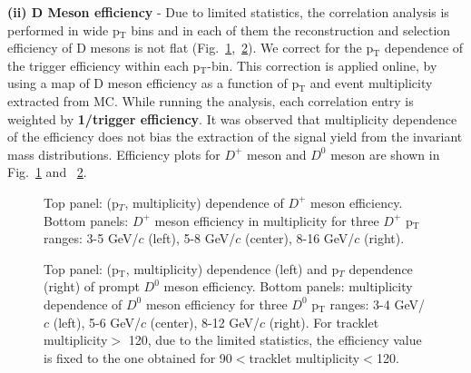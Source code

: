 {\bf \large (ii) D Meson efficiency} - Due to limited statistics, the correlation analysis is performed in wide p$_\mathrm{T}$ bins and in each of them the reconstruction and selection efficiency of D mesons is not flat (Fig.~\ref{fig:dpluseff},~\ref{fig:d0eff}). We correct for the p$_\mathrm{T}$ dependence of the trigger efficiency within each p$_\mathrm{T}$-bin.
This correction is applied online, by using a map of D meson efficiency as a function of p$_\mathrm{T}$ and event multiplicity extracted from MC.
While running the analysis, each correlation entry is weighted by {\bf 1/trigger efficiency}. It was observed that multiplicity dependence of the efficiency does not bias the extraction of the signal yield from the invariant mass distributions. Efficiency plots for $D^{+}$ meson and $D^{0}$ meson are shown in Fig.~\ref{fig:dpluseff} and ~\ref{fig:d0eff}.

\begin{figure}[h]
	\centering
	\caption{Top panel: (p$_T$, multiplicity) dependence of $D^+$ meson efficiency. Bottom panels: $D^+$ meson efficiency in multiplicity for three $D^+$ p$_\mathrm{T}$ranges: 3-5 GeV/$c$ (left), 5-8 GeV/$c$ (center), 8-16 GeV/$c$ (right).}
	\label{fig:dpluseff}	
\end{figure}

\begin{figure}[!htp]
	\centering
	\caption{Top panel: (p$_\mathrm{T}$, multiplicity) dependence (left) and p$_T$ dependence (right) of prompt $D^0$ meson efficiency. Bottom panels: multiplicity dependence of $D^0$ meson efficiency for three $D^0$ p$_\mathrm{T}$ ranges: 3-4 GeV/$c$ (left), 5-6 GeV/$c$ (center), 8-12 GeV/$c$ (right). For tracklet multiplicity$>$ 120, due to the limited statistics, the efficiency value is fixed to the one obtained for 90$<$tracklet multiplicity$<$120.}
	\label{fig:d0eff}	
\end{figure}
\newpage 